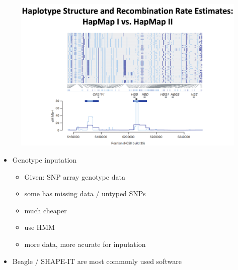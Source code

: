 \documentclass[font=12pt]{article}
\begin{document}
\begin{figure}[h!]
	\centering
	\includegraphics[width=0.7\linewidth]{"haplotype structure"}
	\label{fig:haplotype-structure}
\end{figure}
\begin{itemize}
	\item Genotype inputation
	\begin{itemize}
		\item Given: SNP array genotype data
		\item some has missing data / untyped SNPs
		\item much cheaper
		\item use HMM
		\item more data, more acurate for inputation
	\end{itemize}
	\item Beagle / SHAPE-IT are most commonly used software
\end{itemize}
\end{document}

